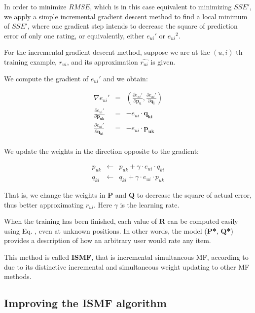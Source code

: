 \documentclass[10pt,a4paper]{article}  %
\begin{document}
In order to minimize $RMSE$, which is in this case equivalent to minimizing $SSE'$, we apply a simple incremental gradient descent method to find a local minimum of $SSE'$, where one gradient step intends to decrease the square of prediction error of only one rating, or equivalently, either ${e_{ui}}'$ or ${e_{ui}}^2$.

For the incremental gradient descent method, suppose we are at the $(u,i)$-th training example, $r_{ui}$, and its approximation $\hat{r_{ui}}$ is given.

We compute the gradient of ${e_{ui}}'$ and we obtain:

\begin{eqnarray}
  \nabla{{e_{ui}}'} &=& \left( \frac{\partial{e_{ui}}'}{\partial{\mathbf{p_u}}}, 
                               \frac{\partial{e_{ui}}'}{\partial{\mathbf{q_i}}} \right) \\
 \frac{\partial{e_{ui}}'}{\partial{\mathbf{p_{uk}}}} &=& -e_{ui} \cdot \mathbf{q_{ki}} \\ 
 \frac{\partial{e_{ui}}'}{\partial{\mathbf{q_{ki}}}} &=& -e_{ui} \cdot \mathbf{p_{uk}} \\
\end{eqnarray}

We update the weights in the direction opposite to the gradient:

\begin{eqnarray}
  p_{uk} &\leftarrow& p_{uk} + \gamma \cdot e_{ui} \cdot q_{ki} \\
  q_{ki} &\leftarrow& q_{ki} + \gamma \cdot e_{ui} \cdot p_{uk} 
\end{eqnarray}

That is, we change the weights in $\mathbf{P}$ and $\mathbf{Q}$ to decrease the square of actual error, thus better approximating $r_{ui}$. Here $\gamma$ is the learning rate. 

When the training has been finished, each value of $\mathbf{R}$ can be computed easily using Eq. , even at unknown positions. In other words, the model (\textbf{P*}, \textbf{Q*}) provides a description of how an arbitrary user would rate any item.

This method is called \textbf{ISMF}, that is incremental simultaneous MF, according to \cite{takacs09scalable} due to its distinctive incremental and simultaneous weight updating to other MF methods.

\subsection{Improving the ISMF algorithm}
\label{rismf}
\end{document}
